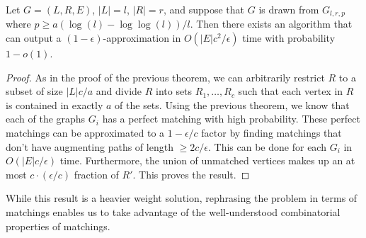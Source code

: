 \begin{thm}
Let $G=(L,R,E)$, $|L|=l$, $|R|=r$, and suppose that $G$ is drawn from $G_{l,r,p}$ where $p \geq a(\log(l)-\log\log(l))/l$. Then there exists an algorithm that can output a $(1-\epsilon)$-approximation in $O(|E|c^2/\epsilon)$ time with probability $1-o(1)$.
\end{thm}
\begin{proof}
As in the proof of the previous theorem, we can arbitrarily restrict $R$ to a subset of size $|L|c/a$ and divide $R$ into sets $R_1,\ldots,R_c$ such that each vertex in $R$ is contained in exactly $a$ of the sets. Using the previous theorem, we know that each of the graphs $G_i$ has a perfect matching with high probability. These perfect matchings can be approximated to a $1-\epsilon/c$ factor by finding matchings that don't have augmenting paths of length $\geq 2c/\epsilon$. This can be done for each $G_i$ in $O(|E|c/\epsilon)$ time. Furthermore, the union of unmatched vertices makes up an at most $c\cdot(\epsilon/c)$ fraction of $R'$. This proves the result. 
\end{proof}

While this result is a heavier weight solution, rephrasing the problem in terms of matchings enables us to take advantage of the well-understood combinatorial properties of matchings.
